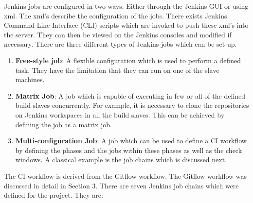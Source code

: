 \documentclass[12pt, a4paper, titlepage]{scrartcl}
\begin{document}
\par Jenkins jobs are configured in two ways. Either through the Jenkins GUI or using xml. The xml's describe the configuration of the jobs. There exists Jenkins Command Line Interface (CLI) scripts which are invoked to push these xml's into the server. They can then be viewed on the Jenkins consoles and modified if necessary. There are three different types of Jenkins jobs which can be set-up.
\begin{enumerate}
\item \textbf{Free-style job}: A flexible configuration which is used to perform a defined task. They have the limitation that they can run on one of the slave machines.
\item \textbf{Matrix Job}: A job which is capable of executing in few or all of the defined build slaves concurrently. For example, it is necessary to clone the repositories on Jenkins workspaces in all the build slaves. This can be achieved by defining the job as a matrix job.
\item \textbf{Multi-configuration Job}: A job which can be used to define a CI workflow by defining the phases and the jobs within these phases as well as the check windows. A classical example is the job chains which is discussed next. 
\end{enumerate}
\par The CI workflow is derived from the Gitflow workflow. The Gitflow workflow was discussed in detail in Section 3. There are seven Jenkins job chains which were defined for the project. They are:
\end{document}
